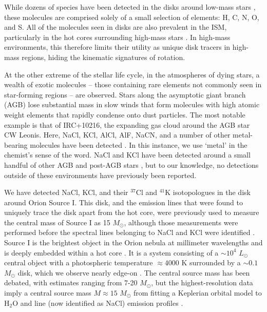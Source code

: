 \documentclass[12pt]{article}
\newcommand{\msun}{\ensuremath{M_{\odot}}\xspace}			%
\newcommand{\lsun}{\ensuremath{L_{\odot}}\xspace}			%
\newcommand{\water}{H$_{2}$O\xspace}		%
\begin{document}
While dozens of species have been detected in the disks around low-mass stars
\cite{McGuire2018c}, these molecules are comprised solely of a small selection
of elements: H, C, N, O, and S.  All of the molecules seen in disks are also
prevalent in the ISM, particularly in the hot cores surrounding high-mass stars
\cite{some sgr b2 reference}. In high-mass environments, this therefore
limits their utility as unique disk tracers in high-mass regions, hiding
the kinematic signatures of rotation.

At the other extreme of the stellar life cycle, in the atmospheres of dying
stars, a wealth of exotic molecules -- those containing rare elements not
commonly seen in star-forming regions -- are observed.  Stars along the
asymptotic giant branch (AGB) lose substantial mass in slow winds
\cite{Herwig2005a} that form molecules with high atomic weight elements that
rapidly condense onto dust particles.  The most notable example is that of
IRC+10216, the expanding gas cloud around the AGB star CW Leonis.  Here, NaCl,
KCl, AlCl, AlF, NaCN, and a number of other metal-bearing molecules have been
detected \cite{Agundez2012a,Zack2011a}.  In this instance, we use `metal' in
the chemist's sense of the word.  NaCl and KCl have been detected around a small handful of other
AGB and post-AGB stars
\cite{Milam2007a,Highberger2003a,Sanchez-Contreras2018a}, but to our
knowledge, no detections outside of these environments have previously been
reported.

We have detected NaCl, KCl, and their $^{37}$Cl and $^{41}$K isotopologues in
the disk around Orion Source I.  This disk, and the emission lines that were
found to uniquely trace the disk apart from the hot core, were previously used
to measure the central mass of Source I as 15 \msun, although those
measurements were performed before the spectral lines belonging to NaCl and KCl
were identified \cite{Ginsburg2018b}.  Source I is the brightest object in the
Orion nebula at millimeter wavelengths and is deeply embedded within a hot core
\cite{}.  It is a system consisting of a $\sim10^4$ \lsun central object with a
photospheric temperature $\approx4000$ K \cite{Testi2010a} surrounded by a
$\sim0.1$ \msun disk, which we observe nearly edge-on \cite{Plambeck2016a}.
The central source mass has been debated, with estimates ranging from 7-20
\msun \cite{Matthews2010a,other}, but the highest-resolution data imply a
central source mass $M\approx15$ \msun from fitting a Keplerian orbital model
to \water and line (now identified as NaCl) emission profiles
\cite{Ginsburg2018b}.
\end{document}
